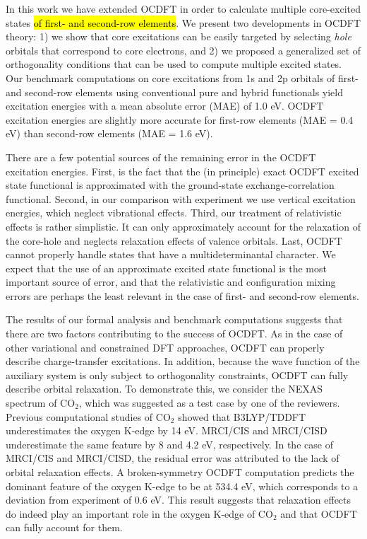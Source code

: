\documentclass[12pt]{article}
\newcommand{\hilight}[1]{\begin{mdframed}[hidealllines=true,backgroundcolor=yellow] {#1} \end{mdframed}}
\begin{document}
In this work we have extended OCDFT in order to calculate multiple core-excited states \hl{of first- and second-row elements}.
We present two developments in OCDFT theory: 1) we show that core excitations can be easily targeted by selecting \textit{hole} orbitals that correspond to core electrons, and 2) we proposed a generalized set of orthogonality conditions that can be used to compute multiple excited states.
Our benchmark computations on core excitations from 1s and 2p orbitals of first- and second-row elements using conventional pure and hybrid functionals yield excitation energies with a mean absolute error (MAE) of 1.0 eV.
OCDFT excitation energies are slightly more accurate for first-row elements (MAE = 0.4 eV) than second-row elements (MAE = 1.6 eV).

\hilight{There are a few potential sources of the remaining error in the OCDFT excitation energies.  First, is the fact that the (in principle) exact OCDFT excited state functional is approximated with the ground-state exchange-correlation functional.
Second, in our comparison with experiment we use vertical excitation energies, which neglect vibrational effects.
Third, our treatment of relativistic effects is rather simplistic.   It can only approximately account for the relaxation of the core-hole and neglects relaxation effects of valence orbitals.  Last, OCDFT cannot properly handle states that have a multideterminantal character.
We expect that the use of an approximate excited state functional is the most important source of error, and that the relativistic and configuration mixing errors are perhaps the least relevant in the case of first- and second-row elements.
}

\hilight{The results of our formal analysis and benchmark computations suggests that there are two factors contributing to the success of OCDFT.
As in the case of other variational and constrained DFT approaches, OCDFT can properly describe charge-transfer excitations.
In addition, because the wave function of the auxiliary system is only subject to orthogonality constraints, OCDFT can fully describe orbital relaxation.
To demonstrate this, we consider the NEXAS spectrum of CO$_2$, which was suggested as a test case by one of the reviewers. 
Previous computational studies of CO$_2$\cite{Maganas:ji} showed that B3LYP/TDDFT underestimates the oxygen K-edge by 14 eV.
MRCI/CIS and MRCI/CISD underestimate the same feature by 8 and 4.2 eV, respectively.
In the case of MRCI/CIS and MRCI/CISD, the residual error was attributed to the lack of orbital relaxation effects.
A broken-symmetry OCDFT computation predicts the dominant feature of the oxygen K-edge to be at 534.4 eV, which corresponds to a deviation from experiment of 0.6 eV.  This result suggests that relaxation effects do indeed play an important role in the oxygen K-edge of CO$_2$ and that OCDFT can fully account for them.
}
\end{document}
